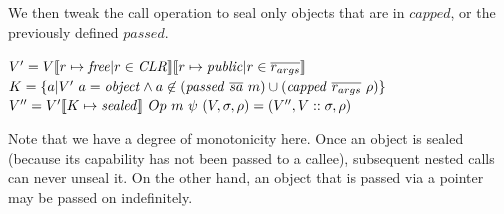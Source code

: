 \documentclass[10pt,conference]{ieeetran}%
\theoremstyle{definition}
\begin{document}
We then tweak the call operation to seal only objects that are in \(\mathit{capped}\), or
the previously defined \(\mathit{passed}\).

               {\(V' = V \llbracket r \mapsto \mathit{free} | r \in \mathit{CLR} \rrbracket
                 \llbracket r \mapsto \mathit{public} | r \in \overline{r_{args}} \rrbracket\)}
               {\(K = \{a | V' ~ a = \mathit{object} \land a \not \in (\mathit{passed} ~ \overline{sa} ~ m) \cup (\mathit{capped} ~ \overline{r_{args}} ~ \rho) \}\)}
               {\(V'' = V'\llbracket K \mapsto \mathit{sealed} \rrbracket\)}
               {\(Op ~ m ~ \psi ~ (V,\sigma,\rho) =
                 (V'',V::\sigma,\rho)\)}

Note that we have a degree of monotonicity here. Once an object is sealed (because its
capability has not been passed to a callee), subsequent nested calls can never unseal it.
On the other hand, an object that is passed via a pointer may be passed on indefinitely.


%

\end{document}
